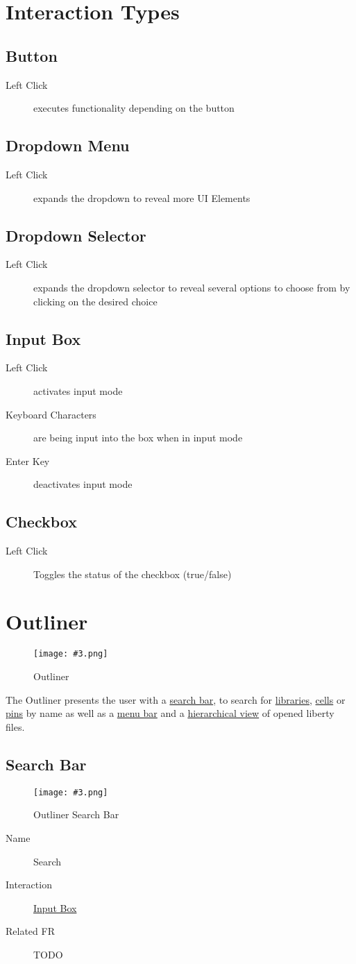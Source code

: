 \documentclass[10pt,a4paper]{report}
\newcommand{\refer}[2]{\hyperref[#1]{\textcolor{col:reference}{#2}}}
\newcommand{\h}[1]{\textcolor{col:highlight}{#1}}
\newcommand{\defit}[3]{\subsection{#2}\label{it:#1}#3}
\newcommand{\ui}[3]{
    \begin{description}
        \item[Name]{#1}
        \item[Interaction]{#2}
        \item[Related FR]{#3}
    \end{description}
}
\newcommand{\refg}[2]{\refer{glo:#1}{#2}}
\newcommand{\includeimage}[5]{
    \begin{figure}[H]
        #1
        \texttt{[image: \#3.png]}
        \caption{#4}
        \label{fig:#5}
    \end{figure}
}
\begin{document}
\section{Interaction Types}
\defit{button}{Button}{
    \begin{description}
        \item[Left Click]{executes functionality depending on the button}
    \end{description}
}
\defit{dropdown_menu}{Dropdown Menu}{
    \begin{description}
            \item[Left Click]{expands the dropdown to reveal more UI Elements}
    \end{description}
}
\defit{dropdown_selector}{Dropdown Selector}{
    \begin{description}
            \item[Left Click]{expands the dropdown selector to reveal several options to choose from by clicking on the desired choice}
    \end{description}
}
\defit{input_box}{Input Box}{
    \begin{description}
        \item[Left Click]{activates \h{input mode}}
        \item[Keyboard Characters]{are being input into the box when in \h{input mode}}
        \item[Enter Key]{deactivates \h{input mode}}
    \end{description}
}
\defit{checkbox}{Checkbox}{
    \begin{description}
        \item[Left Click]{Toggles the status of the checkbox (true/false)}
    \end{description}
}

\section{Outliner}
\label{sec:outliner}
\includeimage{}{0.4}{Outliner}{Outliner}{outliner}
The \h{Outliner} presents the user with a \refer{sec:outliner:search}{search bar}, to search for \refg{library}{libraries}, \refg{cell}{cells} or \refg{pin}{pins} by name as well as a \refer{sec:outliner:menu}{menu bar} and a \refer{sec:outliner:hierarchy}{hierarchical view} of opened liberty files.

\subsection{Search Bar}
\label{sec:outliner:search}
\includeimage{}{0.4}{Outliner Search Bar}{Outliner Search Bar}{outliner_search_bar}
\ui{Search}{\refer{it:input_box}{Input Box}}{TODO}
\end{document}
